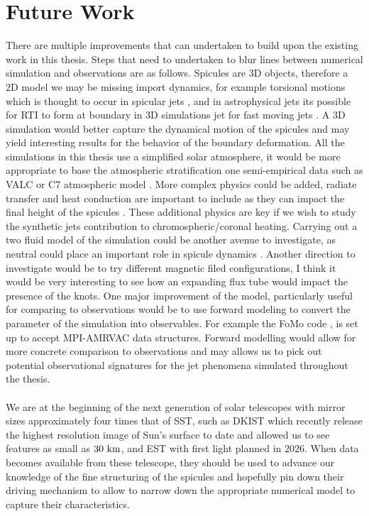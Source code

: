 \documentclass[12pt]{ociamthesis}
\newcommand{\np}{\\ \\}
\begin{document}
\section{Future Work}
\label{sect:fut_work}
There are multiple improvements that can undertaken to build upon the existing work in this thesis. Steps that need to undertaken to blur lines between numerical simulation and observations are as follows. Spicules are 3D objects, therefore a 2D model we may be missing import dynamics, for example torsional motions which is thought to occur in spicular jets \citep{dePontieu2012ApJ752L12D}, and in astrophysical jets its possible for RTI to form at boundary in 3D simulations jet for fast moving jets \citep{Matsumoto772L1M}. A 3D simulation would better capture the dynamical motion of the spicules and may yield interesting results for the behavior of the boundary deformation. All the simulations in this thesis use a simplified solar atmosphere, it would be more appropriate to base the atmospheric stratification one semi-empirical data such as VALC or C7 atmospheric model \citep{Vernazza1981ApJS45635V,Avrett2008ApJS175229A}. More complex physics could be added, radiate transfer and heat conduction are important to include as they can impact the final height of the spicules \citep{Sterling1990ApJ349647S}. These additional physics are key if we wish to study the synthetic jets contribution to chromospheric/coronal heating. Carrying out a two fluid model of the simulation could be another avenue to investigate, as neutral could place an important role in spicule dynamics \citep{kuzma2017ApJ84978K}. Another direction to investigate would be to try different magnetic filed configurations, I think it would be very interesting to see how an expanding flux tube would impact the presence of the knots. One major improvement of the model, particularly useful for comparing to observations would be to use forward modeling to convert the parameter of the simulation into observables. For example the FoMo code \citep{Doorsselaere2016FrASS34V}, is set up to accept MPI-AMRVAC data structures. Forward modelling would allow for more concrete comparison to observations and may allows us to pick out potential observational signatures for the jet phenomena simulated throughout the thesis. \np 
%
We are at the beginning of the next generation of solar telescopes with mirror sizes approximately four times that of SST, such as DKIST  which recently release the highest resolution image of Sun's surface to date and allowed us to see features as small as $30~\rm{km}$, and EST with first light planned in $2026$. When data becomes available from these telescope, they should be used to advance our knowledge of the fine structuring of the spicules and hopefully pin down their driving mechanism to allow to narrow down the appropriate numerical model to capture their characteristics.



  
\end{document}
